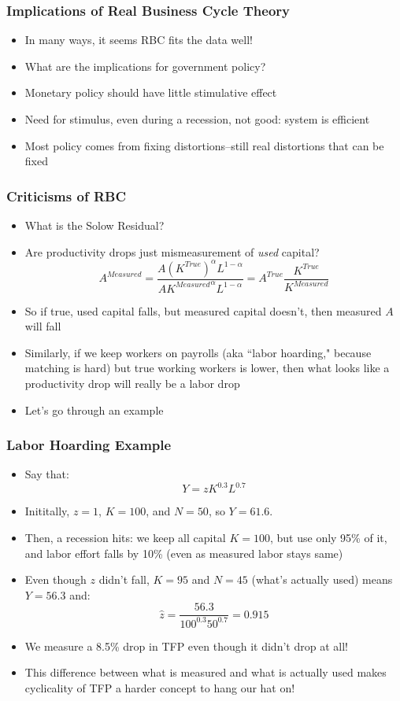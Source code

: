 \documentclass{beamer}
\begin{document}
\begin{frame}
\frametitle[alignment=center]{Implications of Real Business Cycle Theory}
\begin{itemize}
\item In many ways, it seems RBC fits the data well!
\bigskip
\item What are the implications for government policy?
\bigskip
\item Monetary policy should have little stimulative effect
\bigskip
\item Need for stimulus, even during a recession, not good: system is efficient
\bigskip
\item  Most policy comes from fixing distortions--still real distortions that can be fixed
\end{itemize}
\end{frame}

\begin{frame}
\frametitle[alignment=center]{Criticisms of RBC}
\begin{itemize}
\item What is the Solow Residual?  
\bigskip
\item Are productivity drops just mismeasurement of \emph{used} capital?  $$A^{Measured}=\frac{A(K^{True})^\alpha L^{1-\alpha}}{A{K^{Measured}}^\alpha L^{1-\alpha}}=A^{True}\frac{K^{True}}{K^{Measured}}$$
\bigskip
\item So if true, used capital falls, but measured capital doesn't, then measured $A$ will fall
\bigskip
\item Similarly, if we keep workers on payrolls (aka ``labor hoarding," because matching is hard) but true working workers is lower, then what looks like a productivity drop will really be a labor drop
\bigskip
\item Let's go through an example
\end{itemize}
\end{frame}

\begin{frame}
\frametitle[alignment=center]{Labor Hoarding Example}
\begin{itemize}
\item Say that:
$$Y=zK^{0.3}L^{0.7}$$
\item Inititally, $z=1$, $K=100$, and $N=50$, so $Y=61.6$.  
\item Then, a recession hits:  we keep all capital $K=100$, but use only 95\% of it, and labor effort falls by 10\% (even as measured labor stays same)
\item Even though $z$ didn't fall, $K=95$ and $N=45$ (what's actually used) means $Y=56.3$ and:
$$\hat{z}=\frac{56.3}{100^{0.3}50^{0.7}}=0.915$$
\item We measure a 8.5\% drop in TFP even though it didn't drop at all!
\bigskip
\item This difference between what is measured and what is actually used makes cyclicality of TFP a harder concept to hang our hat on!
\end{itemize}
\end{frame}
\end{document}
